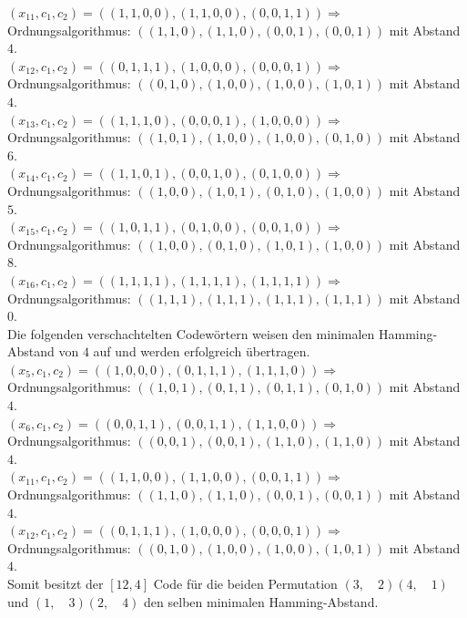 \begin{Beispiel}
    $(x_{11}, c_1, c_2) = ((1,1,0,0), (1,1,0,0), (0,0,1,1)) \Rightarrow$ Ordnungsalgorithmus: $((1,1,0),(1, 1,0),(0,0, 1),(0,0,1))$ mit Abstand $4$.\\
    
    $(x_{12}, c_1, c_2) = ((0,1,1,1), (1,0,0,0), (0,0,0,1)) \Rightarrow$ Ordnungsalgorithmus: $((0,1,0),(1, 0,0),(1,0, 0),(1,0,1))$ mit Abstand $4$.\\
    
    $(x_{13}, c_1, c_2) = ((1,1,1,0), (0,0,0,1), (1,0,0,0)) \Rightarrow$ Ordnungsalgorithmus: $((1,0,1),(1, 0,0),(1,0, 0),(0,1,0))$ mit Abstand $6$.\\
    
    $(x_{14}, c_1, c_2) = ((1,1,0,1), (0,0,1,0), (0,1,0,0)) \Rightarrow$ Ordnungsalgorithmus: $((1,0,0),(1, 0,1),(0,1, 0),(1,0,0))$ mit Abstand $5$.\\
    
    $(x_{15}, c_1, c_2) = ((1,0,1,1), (0,1,0,0), (0,0,1,0)) \Rightarrow$ Ordnungsalgorithmus: $((1,0,0),(0, 1,0),(1,0, 1),(1,0,0))$ mit Abstand $8$.\\
    
    $(x_{16}, c_1, c_2) = ((1,1,1,1), (1,1,1,1), (1,1,1,1)) \Rightarrow$ Ordnungsalgorithmus: $((1,1,1), (1, 1,1),(1,1, 1),(1,1,1))$ mit Abstand $0$.\\
    
    
    Die folgenden verschachtelten Codewörtern weisen den minimalen Hamming-Abstand von $4$ auf und werden erfolgreich übertragen.\\
    
    
    
    $(x_{5}, c_1, c_2) = ((1,0,0,0), (0,1,1,1), (1,1,1,0)) \Rightarrow$ Ordnungsalgorithmus: $((1,0,1),(0, 1,1),(0,1, 1),(0,1,0))$ mit Abstand $4$.\\
    
    $(x_{6}, c_1, c_2) = ((0,0,1,1), (0,0,1,1), (1,1,0,0)) \Rightarrow$ Ordnungsalgorithmus: $((0,0,1),(0, 0,1),(1,1, 0),(1,1,0))$ mit Abstand $4$.\\
    
    $(x_{11}, c_1, c_2) = ((1,1,0,0), (1,1,0,0), (0,0,1,1)) \Rightarrow$ Ordnungsalgorithmus: $((1,1,0),(1, 1,0),(0,0, 1),(0,0,1))$ mit Abstand $4$.\\
    
    $(x_{12}, c_1, c_2) = ((0,1,1,1), (1,0,0,0), (0,0,0,1)) \Rightarrow$ Ordnungsalgorithmus: $((0,1,0),(1, 0,0),(1,0, 0),(1,0,1))$ mit Abstand $4$.\\
    
    
    Somit besitzt der $[12, 4]$ Code für die beiden Permutation $(3,\quad 2)(4,\quad 1)$ und $(1,\quad 3)(2,\quad 4)$ den selben minimalen Hamming-Abstand.
    
\end{Beispiel}
\pagebreak

